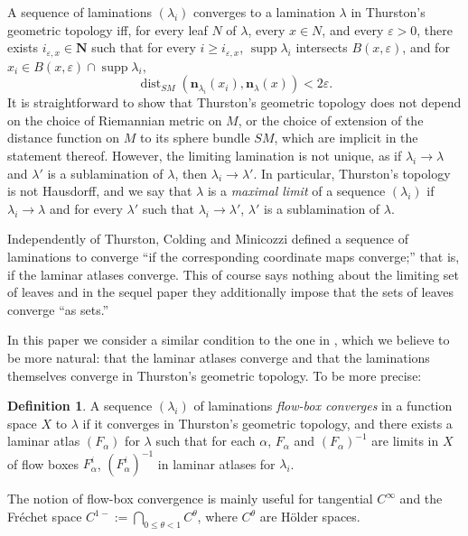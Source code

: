 \documentclass[reqno,11pt]{amsart}
\newcommand{\NN}{\mathbf{N}}
\DeclareMathOperator{\dist}{dist}
\DeclareMathOperator{\supp}{supp}
\newcommand{\normal}{\mathbf n}
\newcommand{\dfn}[1]{\emph{#1}\index{#1}}
\theoremstyle{definition}
\newtheorem{definition}[theorem]{Definition}
\numberwithin{equation}{section}
\begin{document}
A sequence of laminations $(\lambda_i)$ converges to a lamination $\lambda$ in Thurston's geometric topology iff, for every leaf $N$ of $\lambda$, every $x \in N$, and every $\varepsilon > 0$, there exists $i_{\varepsilon, x} \in \NN$ such that for every $i \geq i_{\varepsilon, x}$, $\supp \lambda_i$ intersects $B(x, \varepsilon)$, and for $x_i \in B(x, \varepsilon) \cap \supp \lambda_i$,
$$\dist_{SM}(\normal_{\lambda_i}(x_i), \normal_\lambda(x)) < 2\varepsilon.$$
It is straightforward to show that Thurston's geometric topology does not depend on the choice of Riemannian metric on $M$, or the choice of extension of the distance function on $M$ to its sphere bundle $SM$, which are implicit in the statement thereof.
However, the limiting lamination is not unique, as if $\lambda_i \to \lambda$ and $\lambda'$ is a sublamination of $\lambda$, then $\lambda_i \to \lambda'$.
In particular, Thurston's topology is not Hausdorff, and we say that $\lambda$ is a \dfn{maximal limit} of a sequence $(\lambda_i)$ if $\lambda_i \to \lambda$ and for every $\lambda'$ such that $\lambda_i \to \lambda'$, $\lambda'$ is a sublamination of $\lambda$.

Independently of Thurston, Colding and Minicozzi \cite[Appendix B]{ColdingMinicozziIV} defined a sequence of laminations to converge ``if the corresponding coordinate maps converge;'' that is, if the laminar atlases converge.
This of course says nothing about the limiting set of leaves and in the sequel paper \cite{ColdingMinicozziV} they additionally impose that the sets of leaves converge ``as sets.''

In this paper we consider a similar condition to the one in \cite{ColdingMinicozziV}, which we believe to be more natural: that the laminar atlases converge and that the laminations themselves converge in Thurston's geometric topology.
To be more precise:

\begin{definition}
A sequence $(\lambda_i)$ of laminations \dfn{flow-box converges} in a function space $X$ to $\lambda$ if it converges in Thurston's geometric topology, and there exists a laminar atlas $(F_\alpha)$ for $\lambda$ such that for each $\alpha$, $F_\alpha$ and $(F_\alpha)^{-1}$ are limits in $X$ of flow boxes $F_\alpha^i$, $(F_\alpha^i)^{-1}$ in laminar atlases for $\lambda_i$.
\end{definition}

The notion of flow-box convergence is mainly useful for tangential $C^\infty$ and the Fr\'echet space $C^{1-} := \bigcap_{0 \leq \theta < 1} C^\theta$, where $C^\theta$ are H\"older spaces.
\end{document}
